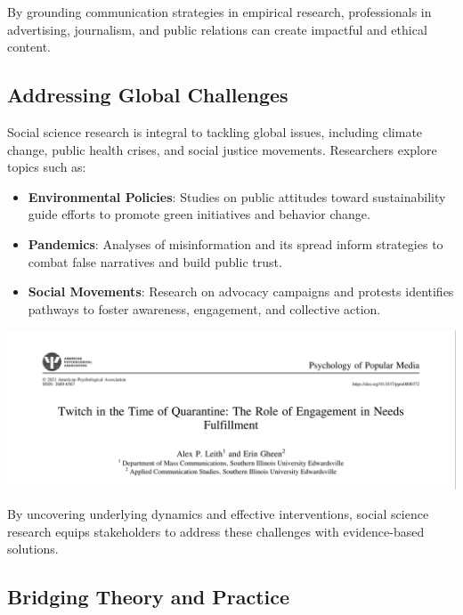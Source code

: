 \documentclass[
]{book}
\providecommand{\tightlist}{%
  \setlength{\itemsep}{0pt}\setlength{\parskip}{0pt}}
\begin{document}
By grounding communication strategies in empirical research, professionals in advertising, journalism, and public relations can create impactful and ethical content.

\subsection*{Addressing Global Challenges}\label{addressing-global-challenges}

Social science research is integral to tackling global issues, including climate change, public health crises, and social justice movements. Researchers explore topics such as:

\begin{itemize}
\tightlist
\item
  \textbf{Environmental Policies}: Studies on public attitudes toward sustainability guide efforts to promote green initiatives and behavior change.
\item
  \textbf{Pandemics}: Analyses of misinformation and its spread inform strategies to combat false narratives and build public trust.
\item
  \textbf{Social Movements}: Research on advocacy campaigns and protests identifies pathways to foster awareness, engagement, and collective action.
\end{itemize}

\href{https://drive.google.com/file/d/1JbErXZc2T6pSm-PsiFTY0j_1VE-MRds0/view}{\includegraphics[width=1\linewidth,height=\textheight,keepaspectratio]{images/quarantine-twitch.png}}

By uncovering underlying dynamics and effective interventions, social science research equips stakeholders to address these challenges with evidence-based solutions.

\subsection*{Bridging Theory and Practice}\label{bridging-theory-and-practice}
\end{document}
